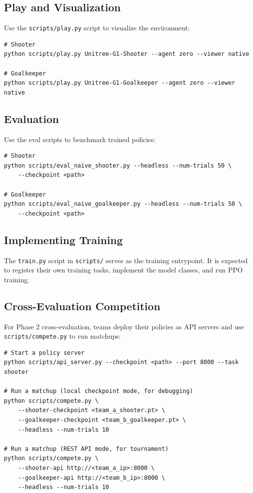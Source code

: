 \documentclass{article}
\begin{document}
\subsection{Play and Visualization}

Use the \texttt{scripts/play.py} script to visualize the environment:

\begin{verbatim}
# Shooter
python scripts/play.py Unitree-G1-Shooter --agent zero --viewer native

# Goalkeeper
python scripts/play.py Unitree-G1-Goalkeeper --agent zero --viewer native
\end{verbatim}

\subsection{Evaluation}

Use the eval scripts to benchmark trained policies:

\begin{verbatim}
# Shooter
python scripts/eval_naive_shooter.py --headless --num-trials 50 \
    --checkpoint <path>

# Goalkeeper
python scripts/eval_naive_goalkeeper.py --headless --num-trials 50 \
    --checkpoint <path>
\end{verbatim}

\subsection{Implementing Training}

The \texttt{train.py} script in \texttt{scripts/} serves as the training entrypoint. It is expected to register their own training tasks, implement the model classes, and run PPO training.

\subsection{Cross-Evaluation Competition}

For Phase 2 cross-evaluation, teams deploy their policies as API servers and use \texttt{scripts/compete.py} to run matchups:

\begin{verbatim}
# Start a policy server
python scripts/api_server.py --checkpoint <path> --port 8000 --task shooter

# Run a matchup (local checkpoint mode, for debugging)
python scripts/compete.py \
    --shooter-checkpoint <team_a_shooter.pt> \
    --goalkeeper-checkpoint <team_b_goalkeeper.pt> \
    --headless --num-trials 10

# Run a matchup (REST API mode, for tournament)
python scripts/compete.py \
    --shooter-api http://<team_a_ip>:8000 \
    --goalkeeper-api http://<team_b_ip>:8000 \
    --headless --num-trials 10
\end{verbatim}
\end{document}
